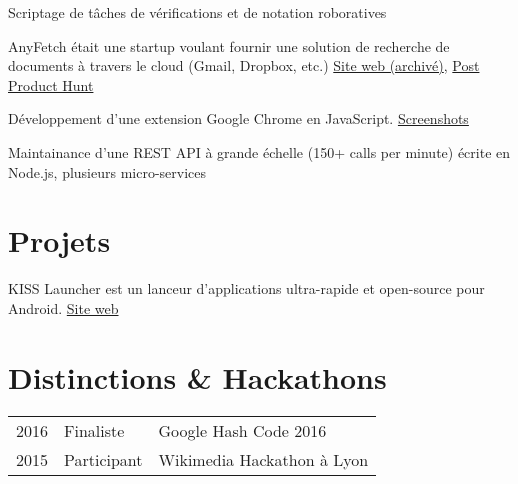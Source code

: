 \documentclass[
  french,
  a4paper
]{resume-openfont}
\begin{document}
\begin{minipage}[t]{0.66\textwidth}
%
%
\vspace{\topsep}
\begin{tightemize}
\item Scriptage de tâches de vérifications et de notation roboratives
\end{tightemize}
\sectionsep

%
%
AnyFetch était une startup voulant fournir une solution de recherche de documents à travers le cloud (Gmail, Dropbox, etc.) \href{https://i.imgur.com/B3MMD6Y.png}{Site web (archivé)}, \href{https://www.producthunt.com/posts/anyfetch}{Post Product Hunt}
\vspace{\topsep}
\begin{tightemize}
\item Développement d'une extension Google Chrome en JavaScript. \href{https://i.imgur.com/yql5v1z.png}{Screenshots}
\item Maintainance d'une REST API à grande échelle (150+ calls per minute) écrite en Node.js, plusieurs micro-services
\end{tightemize}


\section{Projets}
%
%
KISS Launcher est un lanceur d'applications ultra-rapide et open-source pour Android. \href{http://kisslauncher.com/}{Site web}
\sectionsep


\section{Distinctions \& Hackathons}
\begin{tabular}{@{}rll}
2016       & Finaliste   & Google Hash Code 2016\\
2015       & Participant & Wikimedia Hackathon à Lyon
\end{tabular}
\sectionsep

\end{minipage}
\end{document}
